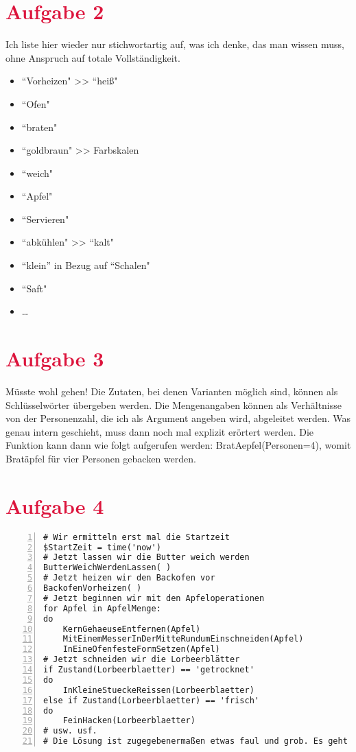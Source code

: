 \documentclass[xetex,svgnames]{scrartcl}
\begin{document}
\section*{\textcolor{Crimson}{Aufgabe 2} }
Ich liste hier wieder nur stichwortartig auf, was ich denke, das man wissen
muss, ohne Anspruch auf totale Vollständigkeit.
\begin{itemize}
    \item ``Vorheizen" >> ``heiß"
    \item ``Ofen"
    \item ``braten"
    \item ``goldbraun" >> Farbskalen
    \item ``weich"
    \item ``Apfel"
    \item ``Servieren"
        \item ``abkühlen" >> ``kalt"
        \item ``klein'' in Bezug auf ``Schalen"
        \item ``Saft"
        \item \ldots
    \end{itemize}
\section*{\textcolor{Crimson}{Aufgabe 3} }
Müsste wohl gehen! Die Zutaten, bei denen Varianten möglich sind, können als
Schlüsselwörter übergeben werden. Die Mengenangaben können als Verhältnisse von der
Personenzahl, die ich als Argument angeben wird, abgeleitet werden. Was genau
intern geschieht, muss dann noch mal explizit erörtert werden.
Die Funktion kann dann wie folgt aufgerufen werden: BratAepfel(Personen=4),
womit Bratäpfel für vier Personen gebacken werden.
\section*{\textcolor{Crimson}{Aufgabe 4} }
\begin{lstlisting}[frame=trLB,numbers=left,numberstyle=\tiny]
# Wir ermitteln erst mal die Startzeit
$StartZeit = time('now') 
# Jetzt lassen wir die Butter weich werden
ButterWeichWerdenLassen( )
# Jetzt heizen wir den Backofen vor
BackofenVorheizen( )
# Jetzt beginnen wir mit den Apfeloperationen
for Apfel in ApfelMenge:
do
    KernGehaeuseEntfernen(Apfel)
    MitEinemMesserInDerMitteRundumEinschneiden(Apfel)
    InEineOfenfesteFormSetzen(Apfel)
# Jetzt schneiden wir die Lorbeerblätter
if Zustand(Lorbeerblaetter) == 'getrocknet'
do 
    InKleineStueckeReissen(Lorbeerblaetter)
else if Zustand(Lorbeerblaetter) == 'frisch'
do
    FeinHacken(Lorbeerblaetter)
# usw. usf. 
# Die Lösung ist zugegebenermaßen etwas faul und grob. Es geht besser...

\end{lstlisting}
\end{document}
